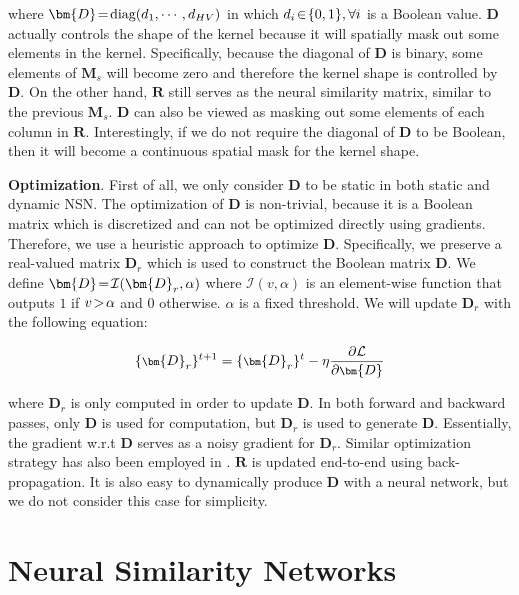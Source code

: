 where $\thickmuskip=2mu \medmuskip=2mu \bm{D}=\textnormal{diag}(d_1,\cdots,d_{HV})$ in which $\thickmuskip=2mu \medmuskip=2mu d_i\in\{0,1\},\forall i$ is a Boolean value. $\bm{D}$ actually controls the shape of the kernel because it will spatially mask out some elements in the kernel. Specifically, because the diagonal of $\bm{D}$ is binary, some elements of $\bm{M}_s$ will become zero and therefore the kernel shape is controlled by $\bm{D}$. On the other hand, $\bm{R}$ still serves as the neural similarity matrix, similar to the previous $\bm{M}_s$. $\bm{D}$ can also be viewed as masking out some elements of each column in $\bm{R}$. Interestingly, if we do not require the diagonal of $\bm{D}$ to be Boolean, then it will become a continuous spatial mask for the kernel shape.

\par
\textbf{Optimization}. First of all, we only consider $\bm{D}$ to be static in both static and dynamic NSN. The optimization of $\bm{D}$ is non-trivial, because it is a Boolean matrix which is discretized and can not be optimized directly using gradients. Therefore, we use a heuristic approach to optimize $\bm{D}$. Specifically, we preserve a real-valued matrix $\bm{D}_r$ which is used to construct the Boolean matrix $\bm{D}$. We define $\thickmuskip=2mu \medmuskip=2mu \bm{D}=\mathcal{I}(\bm{D}_r,\alpha)$ where $\mathcal{I}(v,\alpha)$ is an element-wise function that outputs $1$ if $\thickmuskip=2mu \medmuskip=2mu v>\alpha$ and $0$ otherwise. $\alpha$ is a fixed threshold. We will update $\bm{D}_r$ with the following equation:

\begin{equation}
\footnotesize
    \{\bm{D}_r\}^{t+1} = \{\bm{D}_r\}^{t} -\eta \frac{\partial \mathcal{L}}{\partial\bm{D}}
\end{equation}

where $\bm{D}_r$ is only computed in order to update $\bm{D}$. In both forward and backward passes, only $\bm{D}$ is used for computation, but $\bm{D}_r$ is used to generate $\bm{D}$. Essentially, the gradient w.r.t $\bm{D}$ serves as a noisy gradient for $\bm{D}_r$. Similar optimization strategy has also been employed in \cite{hubara2016binarized,courbariaux2015binaryconnect,mallya2018piggyback}. $\bm{R}$ is updated end-to-end using back-propagation. It is also easy to dynamically produce $\bm{D}$ with a neural network, but we do not consider this case for simplicity.

\section{Neural Similarity Networks}

